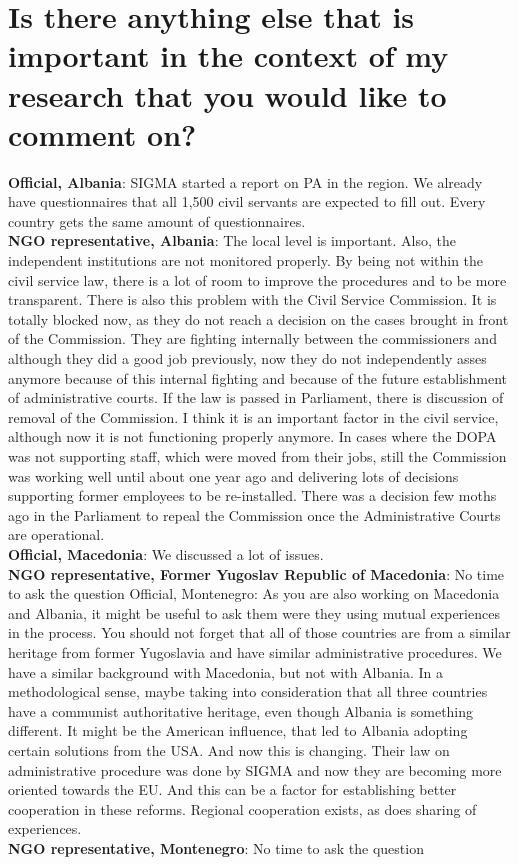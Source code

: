 \section{Is there anything else that is important in the context of my research that you would like to comment on?}
\textbf{Official, Albania}: SIGMA started a report on PA in the region. We already have questionnaires that all 1,500 civil servants are expected to fill out. Every country gets the same amount of questionnaires.  \\
\textbf{NGO representative, Albania}: The local level is important. Also, the independent institutions are not monitored properly. By being not within the civil service law, there is a lot of room to improve the procedures and to be more transparent. There is also this problem with the Civil Service Commission. It is totally blocked now, as they do not reach a decision on the cases brought in front of the Commission. They are fighting internally between the commissioners and although they did a good job previously, now they do not independently asses anymore because of this internal fighting and because of the future establishment of administrative courts. If the law is passed in Parliament, there is discussion of removal of the Commission. I think it is an important factor in the civil service, although now it is not functioning properly anymore. In cases where the DOPA was not supporting staff, which were moved from their jobs, still the Commission was working well until about one year ago and delivering lots of decisions supporting former employees to be re-installed. There was a decision few moths ago in the Parliament to repeal the Commission once the Administrative Courts are operational.  \\
\textbf{Official, Macedonia}: We discussed a lot of issues. \\
\textbf{NGO representative, Former Yugoslav Republic of Macedonia}: No time to ask the question
Official, Montenegro: As you are also working on Macedonia and Albania, it might be useful to ask them were they using mutual experiences in the process. You should not forget that all of those countries are from a similar heritage from former Yugoslavia and have similar administrative procedures. We have a similar background with Macedonia, but not with Albania. In a methodological sense, maybe taking into consideration that all three countries have a communist authoritative heritage, even though Albania is something different. It might be the American influence, that led to Albania adopting certain solutions from the USA. And now this is changing. Their law on administrative procedure was done by SIGMA and now they are becoming more oriented towards the EU. And this can be a factor for establishing better cooperation in these reforms. Regional cooperation exists, as does sharing of experiences. \\
\textbf{NGO representative, Montenegro}: No time to ask the question